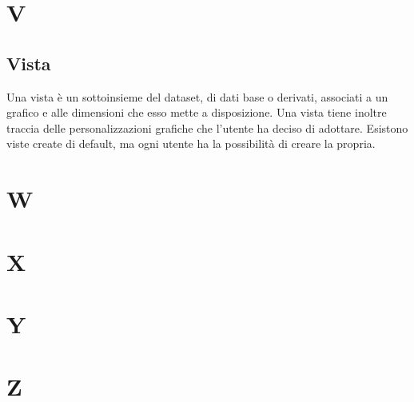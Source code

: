 \newpage
\section{V}
\subsection{Vista}
Una vista è un sottoinsieme del dataset, di dati base o derivati, associati a un grafico e alle dimensioni che esso mette a disposizione. Una vista tiene inoltre traccia delle personalizzazioni grafiche che l'utente ha deciso di adottare. Esistono viste create di default, ma ogni utente ha la possibilità di creare la propria.

\newpage
\section{W}

\newpage
\section{X}

\newpage
\section{Y}

\newpage
\section{Z}